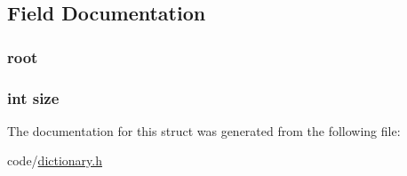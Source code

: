 \subsection{Field Documentation}
\hypertarget{structstruct__dictionary_a06c8b67fb49a1a231098e945e62cc30b}{
\subsubsection[{root}]{ root}}\label{structstruct__dictionary_a06c8b67fb49a1a231098e945e62cc30b}
\hypertarget{structstruct__dictionary_a439227feff9d7f55384e8780cfc2eb82}{
\subsubsection[{size}]{\setlength{\rightskip}{0pt plus 5cm}int size}}\label{structstruct__dictionary_a439227feff9d7f55384e8780cfc2eb82}


The documentation for this struct was generated from the following file\+:\begin{DoxyCompactItemize}
\item 
code/\hyperlink{dictionary_8h}{dictionary.\+h}\end{DoxyCompactItemize}
